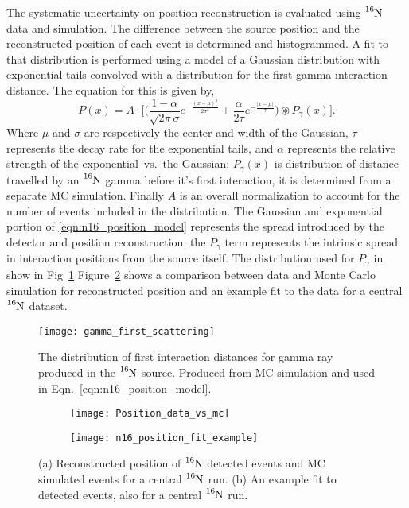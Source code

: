 The systematic uncertainty on position reconstruction is evaluated
using $\ce{^{16}N}$ data and simulation.
The difference between the source position and the reconstructed
position of each event is determined and histogrammed.
A fit to that distribution is performed using a model of a Gaussian distribution
with exponential tails convolved with a distribution for the first gamma interaction
distance. The equation for this is given by,
\begin{equation}
    P(x)  = A \cdot \bigg[ \bigg(\frac{1 - \alpha}{\sqrt{2\pi}\sigma}e^{- \frac{(x-\mu)^2}{2\sigma^2}} + \frac{\alpha }{2 \tau}e^{-\frac{|x-\mu|}{\tau}}\bigg) \circledast P_{\gamma}(x) \bigg]\text{.}
    \label{eqn:n16_position_model}
\end{equation}
Where $\mu$ and $\sigma$ are respectively the center and width of the Gaussian,
$\tau$ represents the decay rate for the exponential tails, and $\alpha$ represents
the relative strength of the exponential~vs.~the Gaussian;
$P_{\gamma}(x)$ is distribution of distance travelled by an $\ce{^{16}N}$
gamma before it's first interaction, it is determined from a separate MC
simulation.
Finally $A$ is an overall normalization to account for the number of events
included in the distribution.
The Gaussian and exponential portion of
\eqref{eqn:n16_position_model} represents the spread introduced by the detector
and position reconstruction, the $P_\gamma$ term represents the intrinsic spread
in interaction positions from the source itself.
The distribution used for $P_\gamma$ in show in Fig~\ref{fig:gamma_first}
Figure~\ref{fig:n16_position_comparison} shows a comparison between data
and Monte Carlo simulation for reconstructed position and an example fit to the data
for a central $\ce{^{16}N}$ dataset.
\begin{figure}[htbp]
    \centering
    \texttt{[image: gamma\_first\_scattering]}
    \caption[Distribution of Gamma First Interaction Distance]{
    The distribution of first interaction distances for gamma ray produced
    in the $\ce{^{16}N}$ source. Produced from MC simulation and used in
    Eqn.~\eqref{eqn:n16_position_model}.}
    \label{fig:gamma_first}
\end{figure}

\begin{figure}[htbp]
\centering
    \begin{subfigure}{0.49\textwidth}
        \centering
        \texttt{[image: Position\_data\_vs\_mc]}
        \caption{}
    \end{subfigure}
    \begin{subfigure}{0.49\textwidth}
        \centering
        \texttt{[image: n16\_position\_fit\_example]}
        \caption{}
    \end{subfigure}
\caption[Reconstructed Postion for $\ce{^{16}N}$ events, Data and MC]{
    (a) Reconstructed position of $\ce{^{16}N}$ detected events and MC simulated
    events for a central $\ce{^{16}N}$ run. (b) An example fit to detected events,
    also for a central $\ce{^{16}N}$ run.}
\label{fig:n16_position_comparison}
\end{figure}


